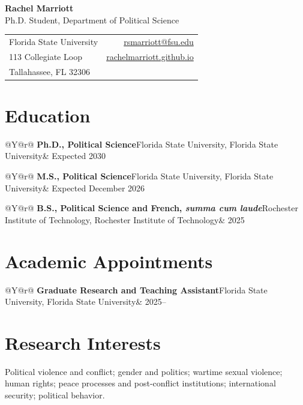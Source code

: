 \documentclass[11pt]{article}
\makeatletter
\newcommand{\cventry}[3]{%
\begin{tabularx}{\linewidth}{@{}Y@{\hspace{1.5em}}r@{}}
\textbf{#1}\ifx\relax#3\relax\else, #3\fi & #2
\end{tabularx}\par\vspace{2pt}%
}
\makeatother
\begin{document}

{\fontsize{24}{28}\selectfont\bfseries Rachel Marriott}\\[4pt]
{\large Ph.D. Student, Department of Political Science}

\vspace{6pt}

\begin{tabularx}{\textwidth}{@{}X r@{}}
Florida State University        & \href{mailto:rsmarriott@fsu.edu}{rsmarriott@fsu.edu} \\
113 Collegiate Loop             & \href{https://rachelmarriott.github.io}{rachelmarriott.github.io} \\
Tallahassee, FL 32306           & \\
\end{tabularx}


\section{Education}

\cventry{Ph.D., Political Science}{Expected 2030}{Florida State University}
\cventry{M.S., Political Science}{Expected December 2026}{Florida State University}
\cventry{B.S., Political Science and French, \textit{summa cum laude}}{2025}{Rochester Institute of Technology}


\section{Academic Appointments}

\cventry{Graduate Research and Teaching Assistant}{2025--}{Florida State University}


\section{Research Interests}

Political violence and conflict; gender and politics; wartime sexual violence; human rights; peace processes and post-conflict institutions; international security; political behavior.
\end{document}
